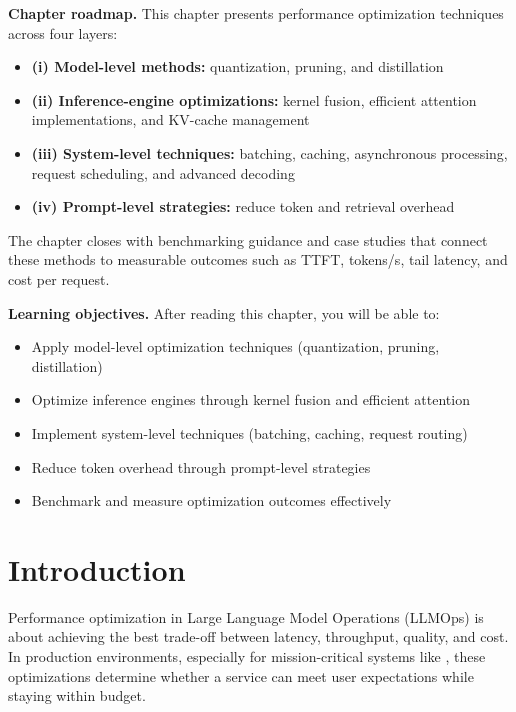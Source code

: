 \begin{tcolorbox}[
  title={\textbf{Chapter Overview}},
  colback=blue!5,
  colframe=blue!40!black,
  colbacktitle=blue!20,
  coltitle=black,
  fonttitle=\bfseries,
  boxrule=0.7pt,
  arc=4pt,
  left=5mm, right=5mm, top=4mm, bottom=4mm
]
\noindent\textbf{Chapter roadmap.}
This chapter presents performance optimization techniques across four layers:
\begin{itemize}[leftmargin=1.5em, itemsep=3pt]
    \item \textbf{(i) Model-level methods:} quantization, pruning, and distillation
    \item \textbf{(ii) Inference-engine optimizations:} kernel fusion, efficient attention implementations, and KV-cache management
    \item \textbf{(iii) System-level techniques:} batching, caching, asynchronous processing, request scheduling, and advanced decoding
    \item \textbf{(iv) Prompt-level strategies:} reduce token and retrieval overhead
\end{itemize}
The chapter closes with benchmarking guidance and \ishtar{} case studies that connect these methods to measurable outcomes such as TTFT, tokens/s, tail latency, and cost per request.

\medskip
\noindent\textbf{Learning objectives.} After reading this chapter, you will be able to:
\begin{itemize}[leftmargin=1.5em, itemsep=3pt]
    \item Apply model-level optimization techniques (quantization, pruning, distillation)
    \item Optimize inference engines through kernel fusion and efficient attention
    \item Implement system-level techniques (batching, caching, request routing)
    \item Reduce token overhead through prompt-level strategies
    \item Benchmark and measure optimization outcomes effectively
\end{itemize}
\end{tcolorbox}


\section{Introduction}
\label{sec:ch7-introduction}
Performance optimization in Large Language Model Operations (LLMOps) is about achieving the best trade-off between latency, throughput, quality, and cost. In production environments, especially for mission-critical systems like \ishtar{}, these optimizations determine whether a service can meet user expectations while staying within budget.


